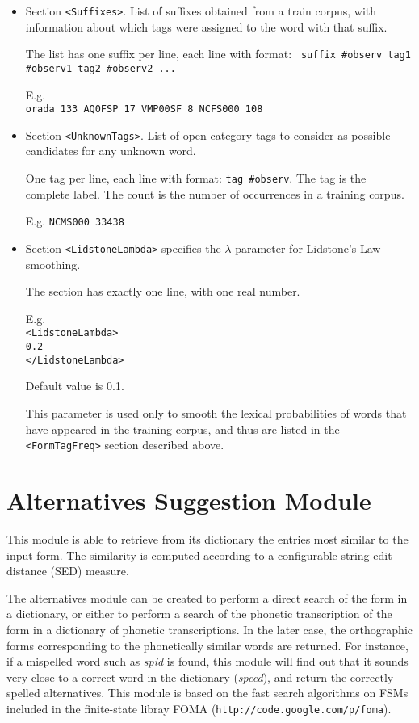 \documentclass[a4paper]{book}
\begin{document}
\begin{itemize}
  \item Section \verb#<Suffixes>#.  List of suffixes obtained from a
    train corpus, with information about which tags were assigned to
    the word with that suffix. 

   The list has one suffix per line, each line with format: {\tt
     suffix \#observ tag1 \#observ1 tag2 \#observ2 ...}

   E.g. \\
   {\tt orada 133 AQ0FSP 17 VMP00SF 8 NCFS000 108}

  \item Section \verb#<UnknownTags>#. List of open-category tags to
  consider as possible candidates for any unknown word. 

   One tag per line, each line with format: {\tt tag \#observ}.  The
   tag is the complete label. The count is the number of occurrences
   in a training corpus.

   E.g. {\tt NCMS000 33438}


   \item Section \verb#<LidstoneLambda># specifies the $\lambda$ parameter for
   Lidstone's Law smoothing.

   The  section has exactly one line, with one real number.

   E.g. \\
   {\tt \verb#<LidstoneLambda>#\\
   0.2\\
   \verb#</LidstoneLambda>#}

   Default value is 0.1.

   This parameter is used only to smooth the lexical probabilities of 
   words that have appeared in the training corpus, and thus are listed
   in the \verb#<FormTagFreq># section described above. 

\end{itemize}

\section{Alternatives Suggestion Module}
\label{file-alter}

  This module is able to retrieve from its dictionary the entries most
 similar to the input form.  
  The similarity is computed according to a configurable string edit 
 distance (SED) measure.

   The alternatives module can be created to perform a direct search 
 of the form in a dictionary, or either to perform a search of the phonetic
 transcription of the form in a dictionary of phonetic transcriptions.
   In the later case, the orthographic forms corresponding to the phonetically
 similar words are returned.
  For instance, if a mispelled word such as {\em spid} is found,
  this module will find out that it sounds very close to a correct
  word in the dictionary ({\em speed}), and return the correctly 
  spelled alternatives.
  This module is based on the fast search algorithms on FSMs included 
  in the finite-state libray FOMA (\texttt{http://code.google.com/p/foma}).
\end{document}

